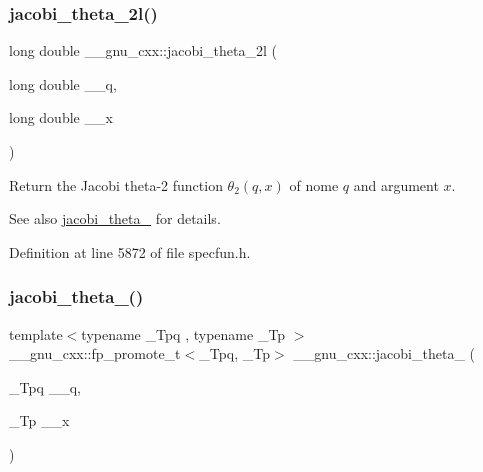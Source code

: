 \subsubsection{\texorpdfstring{jacobi\+\_\+theta\+\_\+2l()}{jacobi\_theta\_2l()}}
{\footnotesize\ttfamily long double \+\_\+\+\_\+gnu\+\_\+cxx\+::jacobi\+\_\+theta\+\_\+2l (\begin{DoxyParamCaption}\item[{long double}]{\+\_\+\+\_\+q,  }\item[{long double}]{\+\_\+\+\_\+x }\end{DoxyParamCaption})\hspace{0.3cm}{\ttfamily [inline]}}

Return the Jacobi theta-\/2 function $ \theta_2(q,x) $ of nome $ q $ and argument $ x $.

\begin{DoxySeeAlso}{See also}
\hyperlink{group__gnu__math__spec__func_gaf6b13dac1f112a870299d75cb4cf42cc}{jacobi\+\_\+theta\+\_} for details. 
\end{DoxySeeAlso}


Definition at line 5872 of file specfun.\+h.

\mbox{\label{group__gnu__math__spec__func_gaf4eac2990db1dadba66ae688ceaa6403}} 
\subsubsection{\texorpdfstring{jacobi\+\_\+theta\+\_()}{jacobi\_theta\_3()}}
{\footnotesize\ttfamily template$<$typename \+\_\+\+Tpq , typename \+\_\+\+Tp $>$ \\
\+\_\+\+\_\+gnu\+\_\+cxx\+::fp\+\_\+promote\+\_\+t$<$\+\_\+\+Tpq, \+\_\+\+Tp$>$ \+\_\+\+\_\+gnu\+\_\+cxx\+::jacobi\+\_\+theta\+\_ (\begin{DoxyParamCaption}\item[{\+\_\+\+Tpq}]{\+\_\+\+\_\+q,  }\item[{\+\_\+\+Tp}]{\+\_\+\+\_\+x }\end{DoxyParamCaption})\hspace{0.3cm}{\ttfamily [inline]}}

